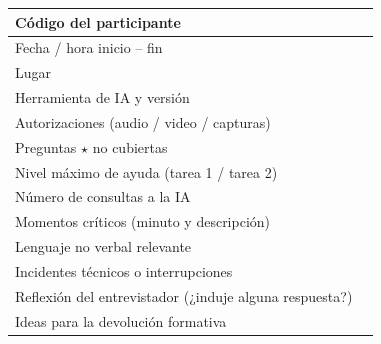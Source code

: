 \documentclass[11pt,letterpaper]{article}
\begin{document}
\begin{center}
\small
\renewcommand{\arraystretch}{1.6}
\begin{tabularx}{\linewidth}{|p{4.5cm}|X|}
\hline
Código del participante & \\ \hline
Fecha / hora inicio -- fin & \\ \hline
Lugar & \\ \hline
Herramienta de IA y versión & \\ \hline
Autorizaciones (audio / video / capturas) & \\ \hline
Preguntas $\star$ no cubiertas & \\ \hline
Nivel máximo de ayuda (tarea 1 / tarea 2) & \\ \hline
Número de consultas a la IA & \\ \hline
Momentos críticos (minuto y descripción) & \\[1.5cm] \hline
Lenguaje no verbal relevante & \\[1cm] \hline
Incidentes técnicos o interrupciones & \\ \hline
Reflexión del entrevistador (¿induje alguna respuesta?) & \\[1.5cm] \hline
Ideas para la devolución formativa & \\[1.2cm] \hline
\end{tabularx}
\end{center}

\newpage
\end{document}
